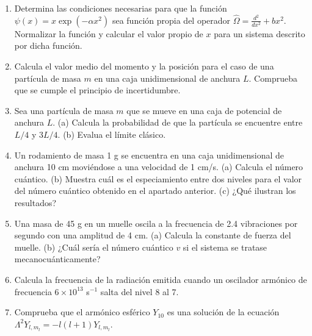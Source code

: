 \documentclass[a4paper, 11pt]{article}
\begin{document}
\begin{enumerate}
   \item Determina las condiciones necesarias 
   para que la función $\psi(x)=x\exp(-\alpha
   x^2)$ sea función propia del operador 
   $\hat{\Omega}=\frac{d^2}{dx^2} + bx^2$.
   Normalizar la función y calcular el valor 
   propio de $x$ para un
   sistema descrito por dicha función.
   
   \item Calcula el valor medio del momento y
   la posición para el caso de una partícula de
   masa $m$ en una caja unidimensional de anchura
   $L$. Comprueba que se cumple el principio de
   incertidumbre.
   
   \item Sea una partícula de masa $m$ que se
   mueve en una caja de potencial de anchura $L$.
   (a) Calcula la probabilidad de que la partícula
   se encuentre entre $L/4$ y $3L/4$. (b) Evalua el
   límite clásico.
   
  \item Un rodamiento de masa 1 g se encuentra
  en una caja unidimensional de anchura 10 cm
  moviéndose a una velocidad de 1 cm/s. (a) Calcula
  el número cuántico. (b) Muestra cuál es el especiamiento
  entre dos niveles para el valor del número cuántico 
  obtenido en el apartado anterior. (c) ¿Qué ilustran los 
  resultados?
  
  \item Una masa de 45 g en un muelle oscila a la 
  frecuencia de 2.4 vibraciones por segundo con 
  una amplitud de 4 cm. (a) Calcula la constante 
  de fuerza del muelle. (b) ¿Cuál sería el número
  cuántico $v$ si el sistema se tratase 
  mecanocuánticamente?
  
  \item Calcula la frecuencia de la radiación emitida
  cuando un oscilador armónico de frecuencia $6\times 10^{13}$
  s$^{-1}$ salta del nivel 8 al 7.
  
  \item Comprueba que el armónico esférico $Y_{10}$ es una solución 
  de la ecuación $\Lambda^2Y_{l,m_l}=-l(l+1)Y_{l,m_l}$.
\end{enumerate}
\end{document}
